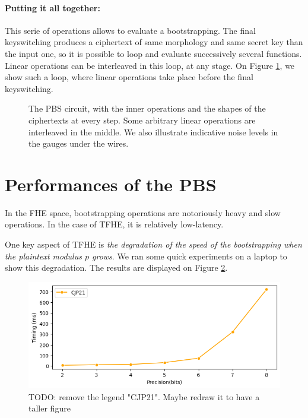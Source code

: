 \paragraph{Putting it all together:}
This serie of operations allows to evaluate a bootstrapping. The final keyswitching produces a ciphertext of same morphology and same secret key than the input one, so it is possible to loop and evaluate successively several functions. Linear operations can be interleaved in this loop, at any stage. On Figure \ref{fig:PBS_layout}, we show such a loop, where linear operations take place before the final keyswitching.



\begin{figure}
	\centering
	
	\caption{The PBS circuit, with the inner operations and the shapes of the ciphertexts at every step. Some arbitrary linear operations are interleaved in the middle. We also illustrate indicative noise levels in the gauges under the wires.}
	\label{fig:PBS_layout}
\end{figure}


\section{Performances of the PBS}
\label{sec:pbs_performances}


In the FHE space, bootstrapping operations are notoriously heavy and slow operations. In the case of TFHE, it is relatively low-latency. 

One key aspect of TFHE is \textit{the degradation of the speed of the bootstrapping when the plaintext modulus $p$ grows}. We ran some quick experiments on a laptop to show this degradation. The results are displayed on Figure \ref{fig:PBS_perfs}.


\begin{figure}
	\centering
	\includegraphics[width=0.8\linewidth]{img/to_harmonize/timings_pbs_precisions.png}
	\caption{TODO: remove the legend "CJP21". Maybe redraw it to have a taller figure}
	\label{fig:PBS_perfs}
\end{figure}



